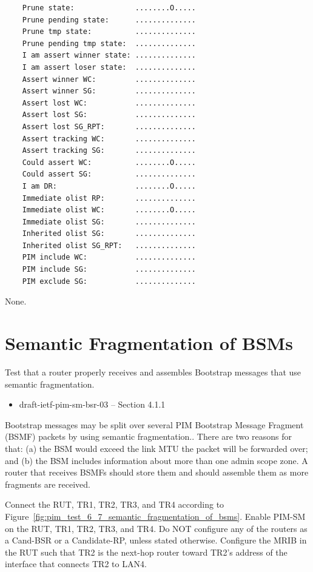 \documentclass[11pt]{report}
\begin{document}
\begin{itemize}
\begin{verbatim}
    Prune state:              ........O.....
    Prune pending state:      ..............
    Prune tmp state:          ..............
    Prune pending tmp state:  ..............
    I am assert winner state: ..............
    I am assert loser state:  ..............
    Assert winner WC:         ..............
    Assert winner SG:         ..............
    Assert lost WC:           ..............
    Assert lost SG:           ..............
    Assert lost SG_RPT:       ..............
    Assert tracking WC:       ..............
    Assert tracking SG:       ..............
    Could assert WC:          ........O.....
    Could assert SG:          ..............
    I am DR:                  ........O.....
    Immediate olist RP:       ..............
    Immediate olist WC:       ........O.....
    Immediate olist SG:       ..............
    Inherited olist SG:       ..............
    Inherited olist SG_RPT:   ..............
    PIM include WC:           ..............
    PIM include SG:           ..............
    PIM exclude SG:           ..............
\end{verbatim}

\end{itemize}

None.

\newpage
\section{Semantic Fragmentation of BSMs}

Test that a router properly receives and assembles Bootstrap messages that use
semantic fragmentation.


\begin{itemize}
  \item draft-ietf-pim-sm-bsr-03 -- Section 4.1.1
\end{itemize}

Bootstrap messages may be split over several PIM Bootstrap Message Fragment
(BSMF) packets by using semantic fragmentation.. There are two reasons for
that: (a) the BSM would exceed the link MTU the packet will be forwarded over;
and (b) the BSM includes information about more than one admin scope zone.
A router that receives BSMFs should store them and should assemble them as
more fragments are received.

Connect the RUT, TR1, TR2, TR3, and TR4 according to
Figure~\ref{fig:pim_test_6_7_semantic_fragmentation_of_bsms}.
Enable PIM-SM on the RUT, TR1, TR2, TR3, and TR4.
Do NOT configure any of the routers as a Cand-BSR or a Candidate-RP,
unless stated otherwise.
Configure the MRIB in the RUT such that TR2 is the next-hop router toward
TR2's address of the interface that connects TR2 to LAN4.
\end{document}
